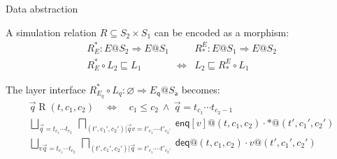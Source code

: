 \documentclass[aspectratio=141]{beamer}
\newcommand{\kw}[1]{\ensuremath{ \mathsf{#1} }}
\begin{document}
\begin{frame}{Data abstraction} %
  \begin{definition}
    A simulation relation $R \subseteq S_2 \times S_1$
    can be encoded as a morphism:
    \[
      \begin{array}{ccc}
        R^*_E : E@S_2 \Rightarrow E@S_1 & &
        R_*^E : E@S_1 \Rightarrow E@S_2 \\[1ex]
        R^*_E \circ L_2 \sqsubseteq L_1 &
        \Leftrightarrow &
        L_2 \sqsubseteq R_*^E \circ L_1
      \end{array}
    \]
  \end{definition}
  \pause
  \begin{example}
    The layer interface
    $R^*_{E_q} \circ L_q : \varnothing \Rightarrow E_\kw{q}@S_\kw{a}$
    becomes:
    \begin{gather*}
      \vec{q} \mathrel{R} (t, c_1, c_2)
      \quad \Leftrightarrow \quad
      c_1 \le c_2 \:\wedge\:
      \vec{q} = t_{c_1} \cdots t_{c_2 - 1} \\[1ex]
      \bigsqcup_{\vec{q} = t_{c_1}\cdots t_{c_2}} \:
      \bigsqcap_{(t', c_1', c_2') | \vec{q}v = t'_{c_1'} \cdots t'_{c_2'}} \:
      \kw{enq}[v]@(t, c_1, c_2) \mathrel{\cdot}
        *@(t', c_1', c_2') \\
        \bigsqcup_{v\vec{q} = t_{c_1}\cdots t_{c_2}} \:
        \bigsqcap_{(t', c_1', c_2') | \vec{q} = t'_{c_1'} \cdots t'_{c_2'}} \:
      \kw{deq}@(t, c_1, c_2) \mathrel{\cdot}
        v@(t', c_1', c_2')
    \end{gather*}
  \end{example}
\end{frame}
\end{document}
